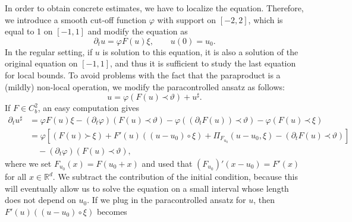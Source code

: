 \documentclass[a4paper,11pt]{article}
\theoremstyle{remark}
\newcommand{\R}{\mathbb{R}}
\newcommand{\lpara}{\,\mathord{\prec}\,}
\newcommand{\rpara}{\,\mathord{\succ}\,}
\newcommand{\reso}{\,\mathord{\circ}\,}
\begin{document}
In order to obtain concrete estimates,
we have to localize the equation. Therefore, we introduce a smooth cut-off
function $\varphi$ with support on $[ -2,2 ]$, which is equal to 1 on $[ -1,1]$ %
and modify the equation as
\[
   \partial_{t} u= \varphi F ( u ) \xi, \qquad u(0) = u_0.
\]
In the regular setting, if $u$ is solution to this equation, it is also a
solution of the original equation on $[ -1,1 ]$, and thus it is sufficient to
study the last equation for local bounds. To avoid problems with the fact
that the paraproduct is a (mildly) non-local operation, we modify the
paracontrolled ansatz as follows:
\begin{equation}\label{eq:ode paracontrolled ansatz localized}
   u= \varphi ( F ( u )\lpara \vartheta ) +u^{\sharp}.
\end{equation}
If $F \in C^2_b$, an easy computation gives
\begin{align*}
   \partial_{t} u^{\sharp} & = \varphi F ( u ) \xi - ( \partial_{t} \varphi )  ( F ( u ) \lpara \vartheta ) - \varphi  ( (\partial_{t} F( u )) \lpara \vartheta ) - \varphi ( F ( u ) \lpara \xi )\\
   & = \varphi \left[ ( F ( u ) \rpara \xi ) +F' ( u )  ( ( u-u_{0} ) \reso \xi ) + \Pi_{F_{u_{0}}} ( u-u_{0} , \xi ) - ( \partial_{t} F ( u ) \lpara \vartheta ) \right] \\
   &\quad - ( \partial_{t} \varphi )  ( F ( u ) \lpara \vartheta ) ,
\end{align*}
where we set $F_{u_{0}} ( x ) =F ( u_{0} +x )$ and used that $( F_{u_{0}} )' (x-u_{0} ) =F' ( x )$ for all $x \in \R^d$. We subtract the contribution of the initial condition,
because this will eventually allow us to solve the equation on a small
interval whose length does not depend on $u_0$. If we plug in
the paracontrolled ansatz for $u$, then $F' ( u ) ( ( u-u_{0} ) \reso \xi )$ becomes
\end{document}
